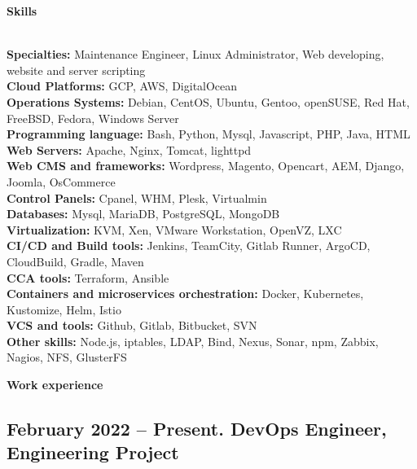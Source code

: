 \documentclass[letterpaper]{article}
\renewcommand{\section}[1]{
  {
    \large \colorbox{my-gray}{
      \begin{minipage}
        {\textwidth-0.175in}
        {\textbf{#1 \vphantom{p\^{E}}}}
      \end{minipage}
    }
  }
}
\begin{document}
\section{Skills}
\label{sec-1}\\
\label{sec-1-1}
\textbf{Specialties:} Maintenance Engineer, Linux Administrator, Web developing, website and server scripting\\
\label{sec-1-2}
\textbf{Cloud Platforms:} GCP, AWS, DigitalOcean\\
\label{sec-1-3}
\textbf{Operations Systems:} Debian, CentOS, Ubuntu, Gentoo, openSUSE, Red Hat, FreeBSD, Fedora, Windows Server\\
\label{sec-1-4}
\textbf{Programming language:} Bash, Python, Mysql, Javascript, PHP, Java, HTML\\
\label{sec-1-5}
\textbf{Web Servers:} Apache, Nginx, Tomcat, lighttpd\\
\label{sec-1-6}
\textbf{Web CMS and frameworks:} Wordpress, Magento, Opencart, AEM, Django, Joomla, OsCommerce\\
\label{sec-1-7}
\textbf{Control Panels:} Cpanel, WHM, Plesk, Virtualmin\\
\label{sec-1-8}
\textbf{Databases:} Mysql, MariaDB, PostgreSQL, MongoDB\\
\label{sec-1-10}
\textbf{Virtualization:} KVM, Xen, VMware Workstation, OpenVZ, LXC\\
\label{sec-1-11}
\textbf{CI/CD and Build tools:} Jenkins, TeamCity, Gitlab Runner, ArgoCD, CloudBuild, Gradle, Maven\\
\label{sec-1-12}
\textbf{CCA tools:} Terraform, Ansible\\
\label{sec-1-13}
\textbf{Containers and microservices orchestration:} Docker, Kubernetes, Kustomize, Helm, Istio\\
\label{sec-1-14}
\textbf{VCS and tools:} Github, Gitlab, Bitbucket, SVN\\
\label{sec-1-15}
\textbf{Other skills:}  Node.js, iptables, LDAP, Bind, Nexus, Sonar, npm, Zabbix, Nagios, NFS, GlusterFS\\
\section{Work experience}
\label{sec-2}

\subsection{{February 2022 – Present}. DevOps Engineer, Engineering Project}
\label{sec-2-1}
\end{document}
